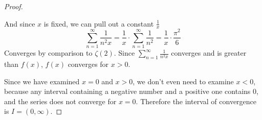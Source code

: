 \documentclass[hidelinks,12pt]{article}
\begin{document}
\begin{enumerate}
\begin{proof}
\begin{itemize}
\[                \]
                And since \(x\) is fixed, we can pull out a constant \(\frac{1}{x}\)\[
                    \sum_{n=1}^{\infty}\frac{1}{n^{2}x}=\frac{1}{x}\cdot\sum_{n=1}^{\infty}\frac{1}{n^{2}}=\frac{1}{x}\cdot\frac{\pi^{2}}{6}
                \]
                Converges by comparison to \(\zeta(2)\). Since \(\sum_{n=1}^{\infty}\frac{1}{n^{2}x}\) converges and is greater than \(f(x)\), \(f(x)\) converges for \(x>0\).
            \end{itemize}
            Since we have examined \(x=0\) and \(x>0\), we don't even need to examine \(x<0\), because any interval containing a negative number and a positive one contains 0, and the series does not converge for \(x=0\). Therefore the interval of convergence is \(I=(0,\infty)\).
        \end{proof}
\end{enumerate}
\end{document}
